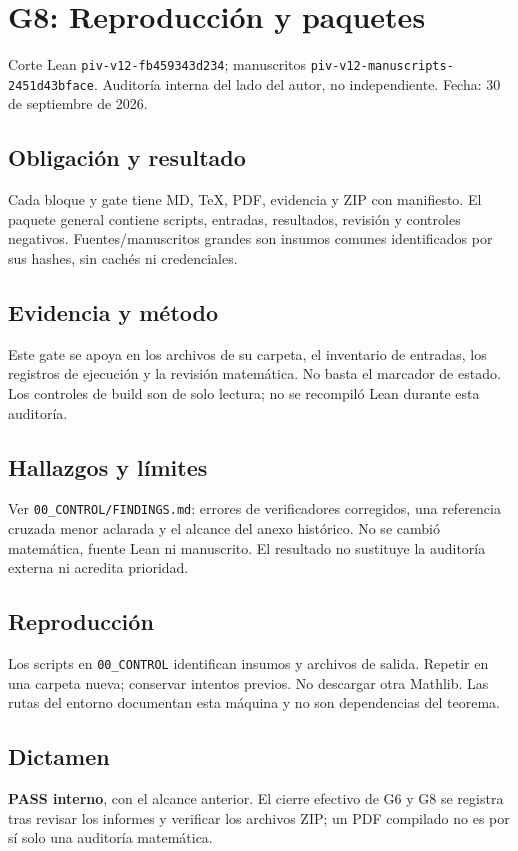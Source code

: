\documentclass[11pt]{article}
\begin{document}
\section{G8: Reproducción y
paquetes}\label{g8-reproducciuxf3n-y-paquetes}

Corte Lean \nolinkurl{piv-v12-fb459343d234}; manuscritos
\nolinkurl{piv-v12-manuscripts-2451d43bface}. Auditoría interna del lado
del autor, no independiente. Fecha: 30 de septiembre de 2026.

\subsection{Obligación y resultado}\label{obligaciuxf3n-y-resultado}

Cada bloque y gate tiene MD, TeX, PDF, evidencia y ZIP con manifiesto.
El paquete general contiene scripts, entradas, resultados, revisión y
controles negativos. Fuentes/manuscritos grandes son insumos comunes
identificados por sus hashes, sin cachés ni credenciales.

\subsection{Evidencia y método}\label{evidencia-y-muxe9todo}

Este gate se apoya en los archivos de su carpeta, el inventario de
entradas, los registros de ejecución y la revisión matemática. No basta
el marcador de estado. Los controles de build son de solo lectura; no se
recompiló Lean durante esta auditoría.

\subsection{Hallazgos y límites}\label{hallazgos-y-luxedmites}

Ver \nolinkurl{00_CONTROL/FINDINGS.md}: errores de verificadores
corregidos, una referencia cruzada menor aclarada y el alcance del anexo
histórico. No se cambió matemática, fuente Lean ni manuscrito. El
resultado no sustituye la auditoría externa ni acredita prioridad.

\subsection{Reproducción}\label{reproducciuxf3n}

Los scripts en \nolinkurl{00_CONTROL} identifican insumos y archivos de
salida. Repetir en una carpeta nueva; conservar intentos previos. No
descargar otra Mathlib. Las rutas del entorno documentan esta máquina y
no son dependencias del teorema.

\subsection{Dictamen}\label{dictamen}

\textbf{PASS interno}, con el alcance anterior. El cierre efectivo de G6
y G8 se registra tras revisar los informes y verificar los archivos ZIP;
un PDF compilado no es por sí solo una auditoría matemática.
\end{document}
